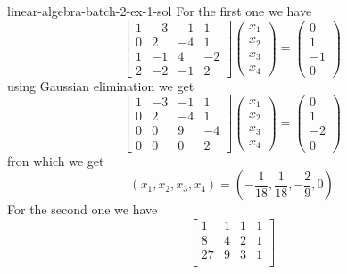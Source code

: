 \documentclass[preview]{standalone}
\begin{document}
\begin{snippetsolution}{linear-algebra-batch-2-ex-1-sol}{}
    For the first one we have
    \[
        \begin{bmatrix}
            1 & -3 & -1 & 1 \\
            0 & 2 & -4 & 1 \\
            1 & -1 & 4 & -2 \\
            2 & -2 & -1 & 2
        \end{bmatrix}
        \begin{pmatrix}
            x_1 \\
            x_2 \\
            x_3 \\
            x_4
        \end{pmatrix}
        = \begin{pmatrix}
            0 \\
            1 \\
            -1 \\
            0
        \end{pmatrix}
    \]
    using Gaussian elimination we get
    \[
        \begin{bmatrix}
            1 & -3 & -1 & 1 \\
            0 & 2 & -4 & 1 \\
            0 & 0 & 9 & -4 \\
            0 & 0 & 0 & 2
        \end{bmatrix}
        \begin{pmatrix}
            x_1 \\
            x_2 \\
            x_3 \\
            x_4
        \end{pmatrix}
        = \begin{pmatrix}
            0 \\
            1 \\
            -2 \\
            0
        \end{pmatrix}
    \]
    fron which we get
    \[
        (x_1, x_2, x_3, x_4) = \left(
            -\frac{1}{18}, \frac{1}{18}, -\frac{2}{9}, 0
        \right)
    \]
    For the second one we have
    \[
        \begin{bmatrix}
            1 & 1 & 1 & 1 \\
            8 & 4 & 2 & 1 \\
            27 & 9 & 3 & 1 \\

\end{bmatrix}\]
\end{snippetsolution}
\end{document}
